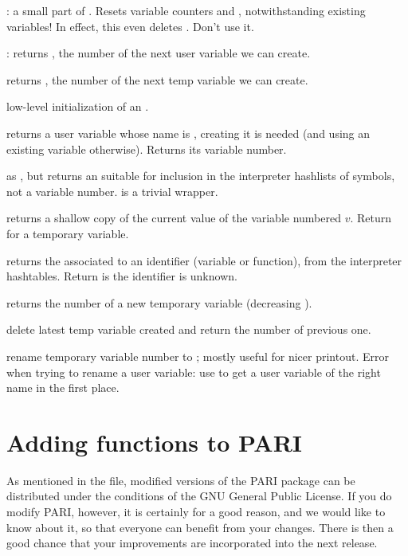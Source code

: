 
: a small part of . Resets
variable counters  and , notwithstanding existing
variables! In effect, this even deletes . Don't use it.

: returns , the number of the next user
variable we can create.

 returns , the number of the
next temp variable we can create.

 low-level initialization of an
.


 returns a user variable whose name
is , creating it is needed (and using an existing variable otherwise).
Returns its variable number.

 as , but
returns an  suitable for inclusion in the interpreter hashlists
of symbols, not a variable number.  is a trivial
wrapper.

 returns a shallow copy of the
current value of the variable numbered $v$. Return  for a temporary
variable.

 returns the  associated
to an identifier  (variable or function), from the interpreter
hashtables. Return  is the identifier is unknown.


 returns the number of a new temporary variable
(decreasing ).

 delete latest temp variable created and return
the number of previous one.

 rename temporary variable number
 to ; mostly useful for nicer printout. Error when trying to
rename a user variable: use  to get a user variable of
the right name in the first place.

\section{Adding functions to PARI}
%
As mentioned in the  file, modified versions of the PARI package
can be distributed under the conditions of the GNU General Public License. If
you do modify PARI, however, it is certainly for a good reason, and we
would like to know about it, so that everyone can benefit from your changes.
There is then a good chance that your improvements are incorporated into the
next release.

